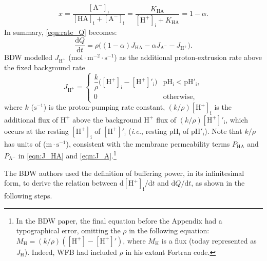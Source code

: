 \documentclass[fleqn,10pt]{physiome}
\begin{document}
\begin{equation}
x=\dfrac{\mathrm{[A^-]_i}}{\mathrm{[HA]_i}+\mathrm{[A^-]_i}}=\dfrac{K_\mathrm{HA}}{\mathrm{[H^+]_i}+K_\mathrm{HA}}=1-\alpha.
\label{eqn:y2}
\end{equation}
In summary, \autoref{eqn:rate_Q} becomes:
\begin{equation}
\dfrac{\mathrm{d}Q}{\mathrm{d}t}=\rho\bigg((1-\alpha)J_\mathrm{HA}-\alpha J_\mathrm{A^-}-J_\mathrm{H^+}\bigg).
\label{eqn:Q_rate2}
\end{equation}
BDW modelled $J_\mathrm{H^+}$ ($\mathrm{mol\cdot m^{-2}\cdot s^{-1}}$) as the additional proton-extrusion rate above the fixed background rate 
\begin{equation}
J_\mathrm{H^+}= 
\begin{cases}
  \dfrac{k}{\rho}\bigg(\mathrm{[H^+]_i}-\mathrm{[H^+]'_i}\bigg)  & \mathrm{pH_i} < \mathrm{{pH}'_i}, \\
  0  & \mathrm{otherwise},
\end{cases}
\label{eqn:pump}
\end{equation}
where $k$ ($\mathrm{s^{-1}}$) is the proton-pumping rate constant, $(k/\rho)\mathrm{[H^+]_i}$ is the additional flux of $\mathrm{H^+}$ above the background $\mathrm{H^+}$ flux of $(k/\rho)\mathrm{[H^+]'_i}$, which occurs at the resting $\mathrm{[H^+]_i}$ of $\mathrm{[H^+]'_i}$ (\emph{i.e.}, resting $\mathrm{pH_i}$ of $\mathrm{{pH}'_i}$). Note that $k/\rho$ has units of ($\mathrm{m\cdot s^{-1}}$), consistent with the membrane permeability terms $P_\mathrm{HA}$ and $P_\mathrm{A^-}$ in \autoref{eqn:J_HA} and \autoref{eqn:J_A}.\footnote{In the BDW paper, the final equation before the Appendix had a typographical error, omitting the $\rho$ in the following equation: $M_\mathrm{H} = (k/\rho)(\mathrm{[H^+]}-\mathrm{[H^+]}')$, where $M_\mathrm{H}$ is a flux (today represented as $J_\mathrm{H}$). Indeed, WFB had included $\rho$ in his extant Fortran code.}

The BDW authors used the definition of buffering power, in its infinitesimal form, to derive the relation between $\mathrm{d}{\mathrm{[H^+]_i}}/\mathrm{d}t$ and $\mathrm{d}Q/\mathrm{d}t$, as shown in the following steps.
\end{document}
